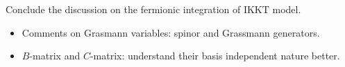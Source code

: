 \begin{todo}
	Conclude the discussion on the fermionic integration of IKKT model.
	\begin{itemize}
		\item Comments on Grasmann variables: spinor and Grassmann generators.
		\item $B$-matrix and $C$-matrix: understand their basis independent nature better.
	\end{itemize}
\end{todo}
